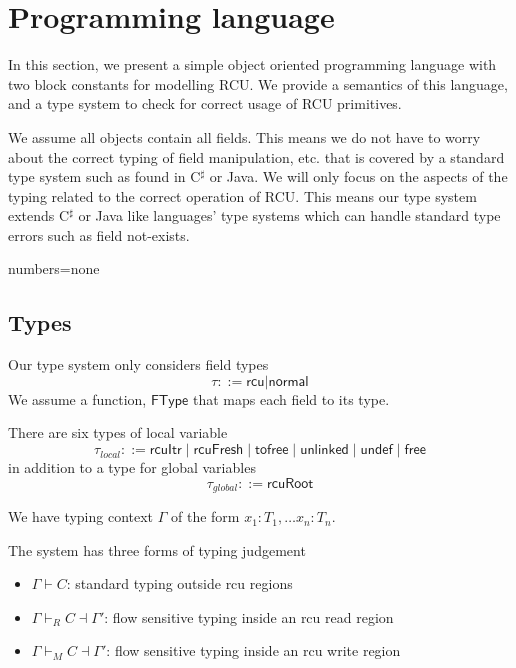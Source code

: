\vspace*{\fill}
\section{Programming language}
In this section, we present a simple object oriented programming language with two block constants for modelling RCU. We provide a semantics of this language, and a type system to check for correct usage of RCU primitives.

We assume all objects contain all fields.  This means we do not have to worry about the correct typing of field manipulation, etc. that is covered by a standard type system such as found in C$^\sharp$ or Java. We will only focus on the aspects of the typing related to the correct operation of RCU. This means our type system extends C$^\sharp$ or Java like languages' type systems which can handle standard type errors such as field not-exists.

{numbers=none}
\subsection{Types}
\label{subsection:subsec-types}
Our type system only considers field types
\[
\tau ::= \textsf{rcu} | \textsf{normal}
\]
We assume a function, $\textsf{FType}$ that maps each field to its type.

There are six types of local variable
\[
\tau_{local} ::=  \textsf{rcuItr} \mid \textsf{rcuFresh} \mid \textsf{tofree} \mid \textsf{unlinked} \mid \textsf{undef} \mid \textsf{free}
\]
in addition to a type for global variables
\[\tau_{global} ::= \textsf{rcuRoot}\]

We have typing context $\Gamma$ of the form $x_1: T_1, \ldots x_n : T_n$.

The system has three forms of typing judgement
\begin{itemize}
\item $\Gamma \vdash C$: standard typing outside rcu regions
\item $\Gamma \vdash_R C \dashv \Gamma'$: flow sensitive typing inside an rcu read region
\item $\Gamma \vdash_M C \dashv \Gamma'$: flow sensitive typing inside an rcu write region
\end{itemize}

